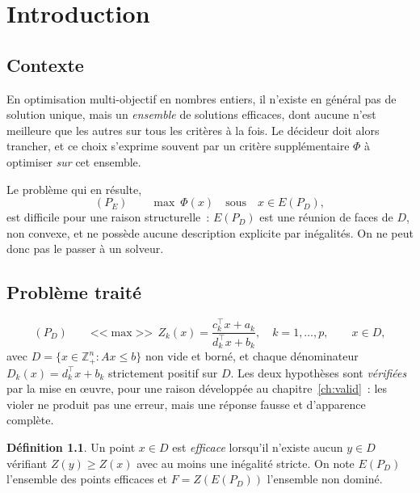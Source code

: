 \documentclass[12pt,a4paper]{report}
\newcommand{\Dset}{D}
\newcommand{\E}{E(P_D)}
\newcommand{\Z}{Z}
\theoremstyle{plain}
\theoremstyle{definition}
\newtheorem{definition}[theoreme]{Définition}
\begin{document}
\begin{abstract}
Sur le problème commun, la recherche dans l'espace des critères l'emporte à
chaque valeur de $p$, de $1{,}52$ à $p=2$ jusqu'à $14{,}57$ à $p=6$, avec des
optima identiques des deux côtés.
\end{abstract}

\tableofcontents

\chapter{Introduction}

\section{Contexte}

En optimisation multi-objectif en nombres entiers, il n'existe en général pas
de solution unique, mais un \emph{ensemble} de solutions efficaces, dont aucune
n'est meilleure que les autres sur tous les critères à la fois.  Le décideur
doit alors trancher, et ce choix s'exprime souvent par un critère
supplémentaire $\Phi$ à optimiser \emph{sur} cet ensemble.

Le problème qui en résulte,
\[
  (P_E) \qquad \max\ \Phi(x) \quad \text{sous} \quad x \in \E ,
\]
est difficile pour une raison structurelle~: $\E$ est une réunion de faces de
$\Dset$, non convexe, et ne possède aucune description explicite par
inégalités.  On ne peut donc pas le passer à un solveur.

\section{Problème traité}

\begin{equation}\label{eq:pd}
  (P_{\Dset}) \qquad \text{<<}\max\text{>>}\ \ \Z_k(x) =
  \frac{c_k^{\top}x + a_k}{d_k^{\top}x + b_k},
  \quad k = 1,\dots,p, \qquad x \in \Dset ,
\end{equation}
avec $\Dset = \{x \in \mathbb{Z}^{n}_{+} : Ax \leqslant b\}$ non vide et borné,
et chaque dénominateur $D_k(x) = d_k^{\top}x + b_k$ strictement positif sur
$\Dset$.  Les deux hypothèses sont \emph{vérifiées} par la mise en {\oe}uvre,
pour une raison développée au chapitre~\ref{ch:valid}~: les violer ne produit
pas une erreur, mais une réponse fausse et d'apparence complète.

\begin{definition}
Un point $x \in \Dset$ est \emph{efficace} lorsqu'il n'existe aucun $y \in
\Dset$ vérifiant $\Z(y) \geqslant \Z(x)$ avec au moins une inégalité stricte.
On note $\E$ l'ensemble des points efficaces et $F = \Z(\E)$ l'ensemble non
dominé.
\end{definition}
\end{document}
